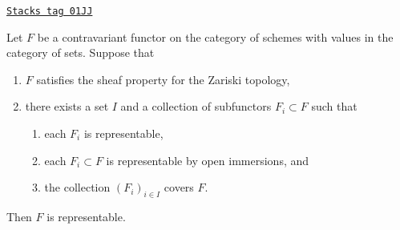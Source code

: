 \begin{lemma}
\label{schemes-lemma-glue-functors}
\href{https://stacks.math.columbia.edu/tag/01JJ}{\texttt{Stacks tag 01JJ}}

Let $F$ be a contravariant functor on the category of schemes
with values in the category of sets. Suppose that
\begin{enumerate}
\item $F$ satisfies the sheaf property for the Zariski topology,
\item there exists a set $I$ and a collection of subfunctors
$F_i \subset F$ such that
\begin{enumerate}
\item each $F_i$ is representable,
\item each $F_i \subset F$ is representable by open immersions, and
\item the collection $(F_i)_{i \in I}$ covers $F$.
\end{enumerate}
\end{enumerate}
Then $F$ is representable.
\end{lemma}

